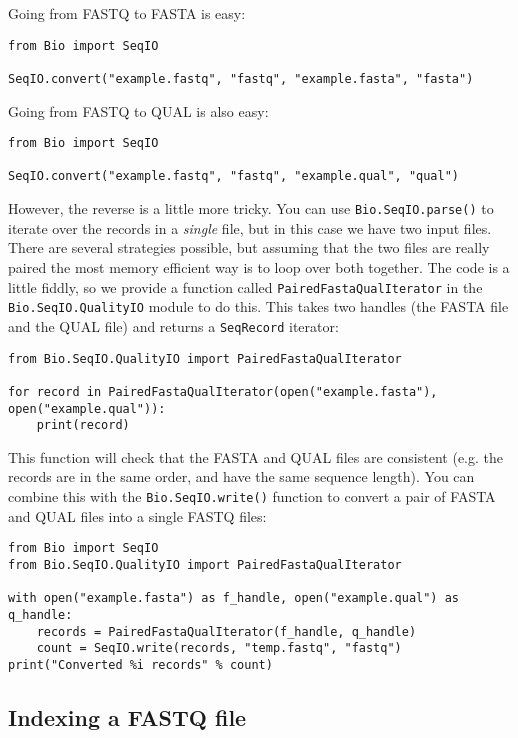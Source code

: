 Going from FASTQ to FASTA is easy:

\begin{verbatim}
from Bio import SeqIO

SeqIO.convert("example.fastq", "fastq", "example.fasta", "fasta")
\end{verbatim}

Going from FASTQ to QUAL is also easy:

\begin{verbatim}
from Bio import SeqIO

SeqIO.convert("example.fastq", "fastq", "example.qual", "qual")
\end{verbatim}

However, the reverse is a little more tricky. You can use \verb|Bio.SeqIO.parse()|
to iterate over the records in a \emph{single} file, but in this case we have
two input files. There are several strategies possible, but assuming that the
two files are really paired the most memory efficient way is to loop over both
together. The code is a little fiddly, so we provide a function called
\verb|PairedFastaQualIterator| in the \verb|Bio.SeqIO.QualityIO| module to do
this. This takes two handles (the FASTA file and the QUAL file) and returns
a \verb|SeqRecord| iterator:

\begin{verbatim}
from Bio.SeqIO.QualityIO import PairedFastaQualIterator

for record in PairedFastaQualIterator(open("example.fasta"), open("example.qual")):
    print(record)
\end{verbatim}

This function will check that the FASTA and QUAL files are consistent (e.g.
the records are in the same order, and have the same sequence length).
You can combine this with the \verb|Bio.SeqIO.write()| function to convert a
pair of FASTA and QUAL files into a single FASTQ files:

\begin{verbatim}
from Bio import SeqIO
from Bio.SeqIO.QualityIO import PairedFastaQualIterator

with open("example.fasta") as f_handle, open("example.qual") as q_handle:
    records = PairedFastaQualIterator(f_handle, q_handle)
    count = SeqIO.write(records, "temp.fastq", "fastq")
print("Converted %i records" % count)
\end{verbatim}

\subsection{Indexing a FASTQ file}
\label{sec:fastq-indexing}

